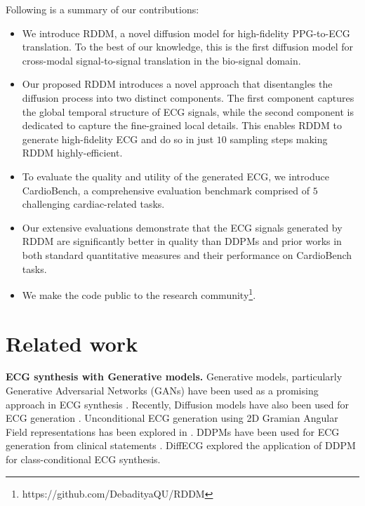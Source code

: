 \documentclass[letterpaper]{article} %
\begin{document}
\noindent Following is a summary of our contributions:
\begin{itemize}[noitemsep,nolistsep,leftmargin=*]

\item We introduce RDDM, a novel diffusion model for high-fidelity PPG-to-ECG translation. To the best of our knowledge, this is the first diffusion model for cross-modal signal-to-signal translation in the bio-signal domain. 

\item Our proposed RDDM introduces a novel approach that disentangles the diffusion process into two distinct components. The first component captures the global temporal structure of ECG signals, while the second component is dedicated to capture the fine-grained local details. This enables RDDM to generate high-fidelity ECG and do so in just $10$ sampling steps making RDDM highly-efficient.
 
\item To evaluate the quality and utility of the generated ECG, we introduce CardioBench, a comprehensive evaluation benchmark comprised of $5$ challenging cardiac-related tasks.
\item
Our extensive evaluations demonstrate that the ECG signals generated by RDDM are significantly better in quality than DDPMs and prior works in both standard quantitative measures and their performance on CardioBench tasks. 
\item 
We make the code public to the research community\footnote{https://github.com/DebadityaQU/RDDM}.

\end{itemize}



\section{Related work}

\textbf{ECG synthesis with Generative models.} 
Generative models, particularly Generative Adversarial Networks (GANs) have been used as a promising approach in ECG synthesis \cite{chen2022me, golany2019pgans}.
Recently, Diffusion models have also been used for ECG generation \cite{alcaraz2023diffusion,adib2023synthetic,neifar2023diffecg}. Unconditional ECG generation using 2D Gramian Angular Field representations has been explored in \cite{adib2023synthetic}. 
DDPMs have been used for ECG generation from clinical statements \cite{alcaraz2023diffusion}. DiffECG \cite{neifar2023diffecg} explored the application of DDPM for class-conditional ECG synthesis.
\end{document}
